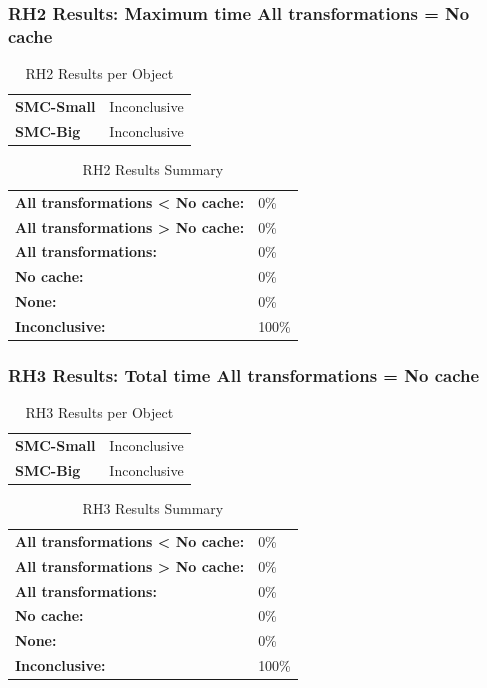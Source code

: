 \documentclass{article}\usepackage[]{graphicx}\usepackage[]{color}
\begin{document}
	
	

	
	\subsubsection{RH2 Results: Maximum time All transformations = No cache}
	
	
	\begin{table}[H]
	\centering
	\caption{RH2 Results per Object}
	\begin{tabular}{ll}
	\textbf{SMC-Small} & Inconclusive \\
	\textbf{SMC-Big} & Inconclusive \\
	\end{tabular}
	\end{table}

	\begin{table}[H]
	\centering
	\caption{RH2 Results Summary}
	\begin{tabular}{ll}
	\textbf{All transformations \textless{} No cache:}& 0\% \\
	\textbf{All transformations \textgreater{} No cache:}& 0\%\\
	\textbf{All transformations:} & 0\%\\
	\textbf{No cache:} & 0\%\\
	\textbf{None:}& 0\%\\
	\textbf{Inconclusive:}& 100\%
			
	
	\end{tabular}
	\end{table}
	
	
	

	
	\subsubsection{RH3 Results: Total time All transformations = No cache}
	
	
	\begin{table}[H]
	\centering
	\caption{RH3 Results per Object}
	\begin{tabular}{ll}
	\textbf{SMC-Small} & Inconclusive \\
	\textbf{SMC-Big} & Inconclusive \\
	\end{tabular}
	\end{table}

	\begin{table}[H]
	\centering
	\caption{RH3 Results Summary}
	\begin{tabular}{ll}
	\textbf{All transformations \textless{} No cache:}& 0\% \\
	\textbf{All transformations \textgreater{} No cache:}& 0\%\\
	\textbf{All transformations:} & 0\%\\
	\textbf{No cache:} & 0\%\\
	\textbf{None:}& 0\%\\
	\textbf{Inconclusive:}& 100\%
			
	
	\end{tabular}
	\end{table}
	
\end{document}
